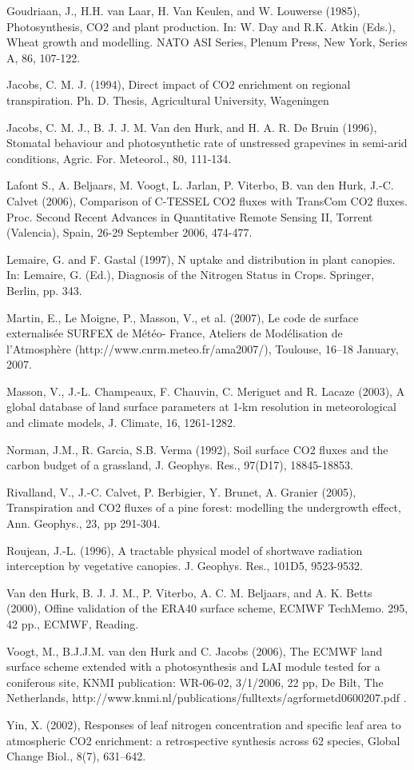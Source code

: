 \begin{description}
Goudriaan, J., H.H. van Laar, H. Van Keulen, and W. Louwerse (1985), Photosynthesis, CO2 and
plant production. In: W. Day and R.K. Atkin (Eds.), Wheat growth and modelling. NATO ASI Series,
Plenum Press, New York, Series A, 86, 107-122.
\item
Jacobs, C. M. J. (1994), Direct impact of CO2 enrichment on regional transpiration. Ph. D. Thesis,
Agricultural University, Wageningen
\item
Jacobs, C. M. J., B. J. J. M. Van den Hurk, and H. A. R. De Bruin (1996), Stomatal behaviour and
photosynthetic rate of unstressed grapevines in semi-arid conditions, Agric. For. Meteorol., 80,
111-134.
\item
Lafont S., A. Beljaars, M. Voogt, L. Jarlan, P. Viterbo, B. van den Hurk, J.-C. Calvet (2006),
Comparison of C-TESSEL CO2 fluxes with TransCom CO2 fluxes. Proc. Second Recent Advances
in Quantitative Remote Sensing II, Torrent (Valencia), Spain, 26-29 September 2006, 474-477.
\item
Lemaire, G. and F. Gastal (1997), N uptake and distribution in plant canopies. In: Lemaire, G. (Ed.),
Diagnosis of the Nitrogen Status in Crops. Springer, Berlin, pp. 343.
\item
Martin, E., Le Moigne, P., Masson, V., et al. (2007), Le code de surface externalis\'ee SURFEX de
M\'et\'eo- France, Ateliers de Mod\'elisation de l’Atmosph\`ere (http://www.cnrm.meteo.fr/ama2007/),
Toulouse, 16–18 January, 2007.
\item
Masson, V., J.-L. Champeaux, F. Chauvin, C. Meriguet and R. Lacaze (2003), A global database of
land surface parameters at 1-km resolution in meteorological and climate models, J. Climate, 16,
1261-1282.
\item
Norman, J.M., R. Garcia, S.B. Verma (1992), Soil surface CO2 fluxes and the carbon budget of a
grassland, J. Geophys. Res., 97(D17), 18845-18853.
\item
Rivalland, V., J.-C. Calvet, P. Berbigier, Y. Brunet, A. Granier (2005), Transpiration and CO2 fluxes of
a pine forest: modelling the undergrowth effect, Ann. Geophys., 23, pp 291-304.
\item
Roujean, J.-L. (1996), A tractable physical model of shortwave radiation interception by vegetative
canopies. J. Geophys. Res., 101D5, 9523-9532.
\item
Van den Hurk, B. J. J. M., P. Viterbo, A. C. M. Beljaars, and A. K. Betts (2000), Offine validation of the
ERA40 surface scheme, ECMWF TechMemo. 295, 42 pp., ECMWF, Reading.
\item
Voogt, M., B.J.J.M. van den Hurk and C. Jacobs (2006), The ECMWF land surface scheme extended
with a photosynthesis and LAI module tested for a coniferous site, KNMI publication: WR-06-02,
3/1/2006, 22 pp, De Bilt, The Netherlands,
http://www.knmi.nl/publications/fulltexts/agrformetd0600207.pdf .
\item
Yin, X. (2002), Responses of leaf nitrogen concentration and specific leaf area to atmospheric CO2
enrichment: a retrospective synthesis across 62 species, Global Change Biol., 8(7), 631–642.


\end{description}

